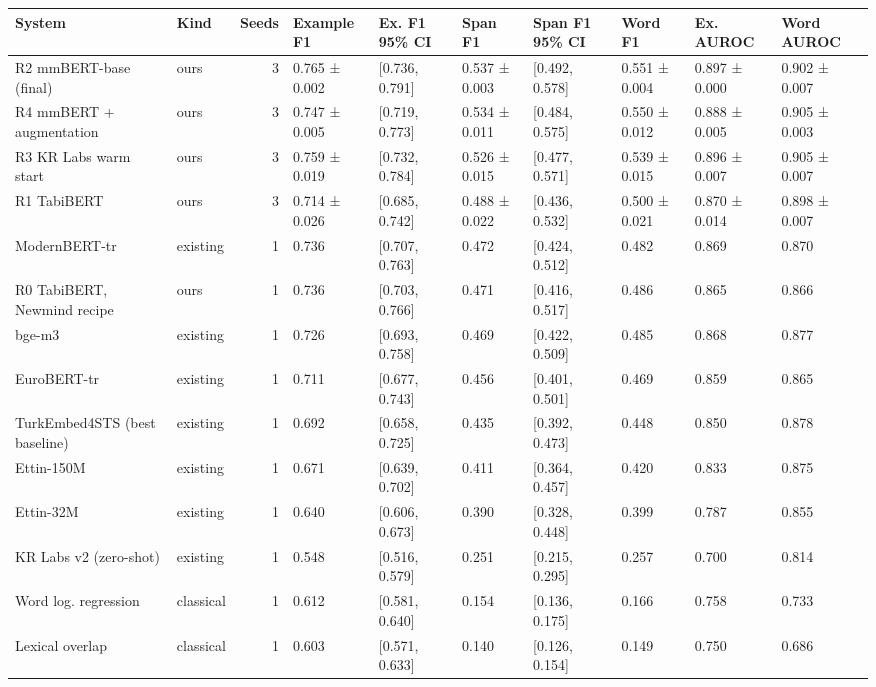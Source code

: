 \begin{tabular}{llrlllllll}
\toprule
System & Kind & Seeds & Example F1 & Ex. F1 95\% CI & Span F1 & Span F1 95\% CI & Word F1 & Ex. AUROC & Word AUROC \\
\midrule
R2 mmBERT-base (final) & ours & 3 & 0.765 ± 0.002 & [0.736, 0.791] & 0.537 ± 0.003 & [0.492, 0.578] & 0.551 ± 0.004 & 0.897 ± 0.000 & 0.902 ± 0.007 \\
R4 mmBERT + augmentation & ours & 3 & 0.747 ± 0.005 & [0.719, 0.773] & 0.534 ± 0.011 & [0.484, 0.575] & 0.550 ± 0.012 & 0.888 ± 0.005 & 0.905 ± 0.003 \\
R3 KR Labs warm start & ours & 3 & 0.759 ± 0.019 & [0.732, 0.784] & 0.526 ± 0.015 & [0.477, 0.571] & 0.539 ± 0.015 & 0.896 ± 0.007 & 0.905 ± 0.007 \\
R1 TabiBERT & ours & 3 & 0.714 ± 0.026 & [0.685, 0.742] & 0.488 ± 0.022 & [0.436, 0.532] & 0.500 ± 0.021 & 0.870 ± 0.014 & 0.898 ± 0.007 \\
ModernBERT-tr & existing & 1 & 0.736 & [0.707, 0.763] & 0.472 & [0.424, 0.512] & 0.482 & 0.869 & 0.870 \\
R0 TabiBERT, Newmind recipe & ours & 1 & 0.736 & [0.703, 0.766] & 0.471 & [0.416, 0.517] & 0.486 & 0.865 & 0.866 \\
bge-m3 & existing & 1 & 0.726 & [0.693, 0.758] & 0.469 & [0.422, 0.509] & 0.485 & 0.868 & 0.877 \\
EuroBERT-tr & existing & 1 & 0.711 & [0.677, 0.743] & 0.456 & [0.401, 0.501] & 0.469 & 0.859 & 0.865 \\
TurkEmbed4STS (best baseline) & existing & 1 & 0.692 & [0.658, 0.725] & 0.435 & [0.392, 0.473] & 0.448 & 0.850 & 0.878 \\
Ettin-150M & existing & 1 & 0.671 & [0.639, 0.702] & 0.411 & [0.364, 0.457] & 0.420 & 0.833 & 0.875 \\
Ettin-32M & existing & 1 & 0.640 & [0.606, 0.673] & 0.390 & [0.328, 0.448] & 0.399 & 0.787 & 0.855 \\
KR Labs v2 (zero-shot) & existing & 1 & 0.548 & [0.516, 0.579] & 0.251 & [0.215, 0.295] & 0.257 & 0.700 & 0.814 \\
Word log. regression & classical & 1 & 0.612 & [0.581, 0.640] & 0.154 & [0.136, 0.175] & 0.166 & 0.758 & 0.733 \\
Lexical overlap & classical & 1 & 0.603 & [0.571, 0.633] & 0.140 & [0.126, 0.154] & 0.149 & 0.750 & 0.686 \\
\bottomrule
\end{tabular}
